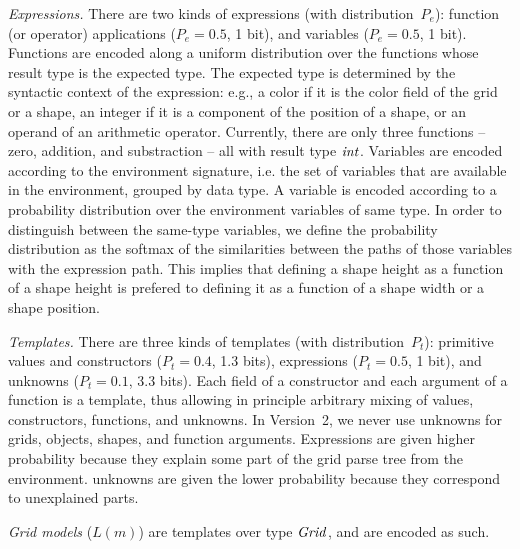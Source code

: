 \documentclass[a4paper]{llncs}
\begin{document}
{\em Expressions.} There are two kinds of expressions (with
distribution~$P_e$): function (or operator) applications ($P_e = 0.5$,
1 bit), and variables ($P_e = 0.5$, 1 bit). Functions are encoded
along a uniform distribution over the functions whose result type is
the expected type. The expected type is determined by the syntactic
context of the expression: e.g., a color if it is the color field of
the grid or a shape, an integer if it is a component of the position
of a shape, or an operand of an arithmetic operator. Currently, there
are only three functions -- zero, addition, and substraction -- all
with result type ${\it int}$. Variables are encoded according to the
environment signature, i.e. the set of variables that are available in
the environment, grouped by data type. A variable is encoded according
to a probability distribution over the environment variables of same
type. In order to distinguish between the same-type variables, we
define the probability distribution as the softmax of the similarities
between the paths of those variables with the expression path. This
implies that defining a shape height as a function of a shape height
is prefered to defining it as a function of a shape width or a shape
position.

{\em Templates.} There are three kinds of templates (with
distribution~$P_t$): primitive values and constructors ($P_t = 0.4$,
1.3 bits), expressions ($P_t = 0.5$, 1 bit), and unknowns
($P_t = 0.1$, 3.3 bits). Each field of a constructor and each argument
of a function is a template, thus allowing in principle arbitrary
mixing of values, constructors, functions, and unknowns. In Version~2,
we never use unknowns for grids, objects, shapes, and function
arguments. Expressions are given higher probability because they
explain some part of the grid parse tree from the
environment. unknowns are given the lower probability because they
correspond to unexplained parts.

{\em Grid models} ($L(m)$) are templates over type ${\it Grid}$,
and are encoded as such.
\end{document}

